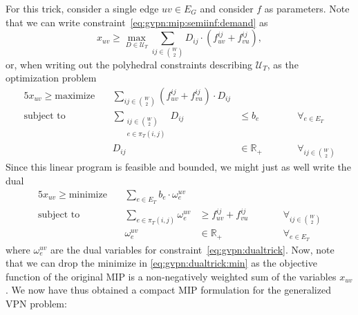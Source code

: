 For this trick, consider a single edge $uv \in E_G$ and consider $f$ as parameters.
Note that we can write constraint~\ref{eq:gvpn:mip:semiinf:demand} as
\[
    x_{uv} \ge \max_{D \in \mathcal U_T} \sum_{ij \in \binom W 2} D_{ij} \cdot (f^{ij}_{uv} + f^{ij}_{vu}),
\]
or, when writing out the polyhedral constraints describing $\mathcal U_T$, as the optimization problem
\begin{alignat}{5}
    x_{uv} \ge \text{maximize}\ && \sum_{ij \in \binom{W}{2}} (f_{uv}^{ij} + f_{vu}^{ij}) \cdot D_{ij} &&& \\
    \text{subject to}\ && \sum_{\substack{ij \in \binom{W}{2}\\e \in \pi_T(i,j)}} D_{ij} &\le b_e &&\qquad \forall_{e \in E_T} \label{eq:gvpn:dualtrick} \\
    && D_{ij} &\in \mathbb{R}_+ &&\qquad \forall_{ij \in \binom{W}{2}}
\end{alignat}
Since this linear program is feasible and bounded, we might just as well write the dual
\begin{alignat}{5}
    x_{uv} \ge \text{minimize}\ && \sum_{e \in E_T} b_e \cdot \omega_e^{uv} &&& \label{eq:gvpn:dualtrick:min} \\
    \text{subject to}\ && \sum_{e \in \pi_T(i,j)} \omega_e^{uv} &\ge f_{uv}^{ij} + f_{vu}^{ij} &&\qquad \forall_{ij \in \binom{W}{2}} \\
    && \omega_e^{uv} &\in \mathbb{R}_+ &&\qquad \forall_{e \in E_T}
\end{alignat}
where $\omega_e^{uv}$ are the  dual variables for constraint~\ref{eq:gvpn:dualtrick}.
Now, note that we can drop the minimize in \ref{eq:gvpn:dualtrick:min} as the objective function of the original MIP is a non-negatively weighted sum of the variables $x_{uv}$.
We now have thus obtained a compact MIP formulation for the generalized VPN problem:
